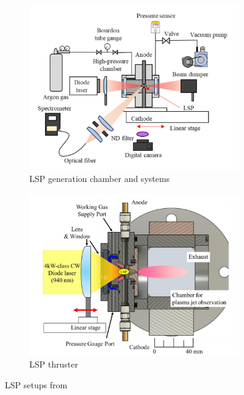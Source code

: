         \begin{figure}[!ht]
            \centering
            \begin{subfigure}[t]{0.45\textwidth}
                \centering
                \includegraphics[width=\textwidth]{assets/2 background/Takano LSP chamber.png}
                \caption{LSP generation chamber and systems}
                \label{fig:Takano LSP generation chamber}
            \end{subfigure}
            \hfill
            \begin{subfigure}[t]{0.45\textwidth}
                \centering
                \includegraphics[width=\textwidth]{assets/2 background/Takano LSP thruster.png}
                \caption{LSP thruster}
                \label{fig:Takano LSP thruster}
            \end{subfigure}
            \caption{LSP setups from \textcite{takanoDemonstrationDiodeLasersustained}}
            \label{fig:Takano apparatussies}
        \end{figure}
